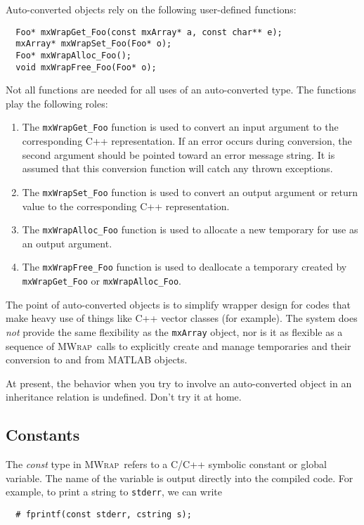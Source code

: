 \documentclass[12pt]{article}
\newcommand{\mwrap}{\textsc{MWrap}}
\begin{document}
Auto-converted objects rely on the following user-defined functions:
\begin{verbatim}
  Foo* mxWrapGet_Foo(const mxArray* a, const char** e);
  mxArray* mxWrapSet_Foo(Foo* o);
  Foo* mxWrapAlloc_Foo();
  void mxWrapFree_Foo(Foo* o);
\end{verbatim}
Not all functions are needed for all uses of an auto-converted type.
The functions play the following roles:
\begin{enumerate}
\item
  The \verb|mxWrapGet_Foo| function is used to convert an input argument
  to the corresponding C++ representation.  If an error occurs during
  conversion, the second argument should be pointed toward an error message
  string.  It is assumed that this conversion function will catch any thrown
  exceptions.
\item
  The \verb|mxWrapSet_Foo| function is used to convert an output argument
  or return value to the corresponding C++ representation.
\item
  The \verb|mxWrapAlloc_Foo| function is used to allocate a new temporary
  for use as an output argument.
\item
  The \verb|mxWrapFree_Foo| function is used to deallocate a temporary
  created by \verb|mxWrapGet_Foo| or \verb|mxWrapAlloc_Foo|.
\end{enumerate}

The point of auto-converted objects is to simplify wrapper design for
codes that make heavy use of things like C++ vector classes (for example).
The system does {\em not} provide the same flexibility as the {\tt mxArray}
object, nor is it as flexible as a sequence of \mwrap\ calls to explicitly
create and manage temporaries and their conversion to and from MATLAB objects.

At present, the behavior when you try to involve an auto-converted object
in an inheritance relation is undefined.  Don't try it at home.


\subsection{Constants}

The {\it const} type in \mwrap\ refers to a C/C++ symbolic constant or
global variable.  The name of the variable is output directly into the
compiled code.  For example, to print a string to {\tt stderr}, we can
write
\begin{verbatim}
  # fprintf(const stderr, cstring s);
\end{verbatim}
\end{document}
